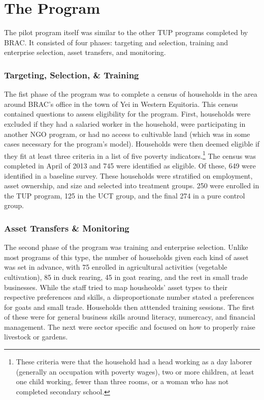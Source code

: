 \documentclass[12pt,article]{article}
\begin{document}
\section*{The Program}
\label{sec-2}

The pilot program itself was similar to the other TUP programs completed by BRAC. It
consisted of four phases: targeting and selection, training and enterprise selection,
asset transfers, and monitoring. 

\subsubsection*{Targeting, Selection, \& Training}
\label{sec-2-0-1}

The fist phase of the program was to complete a census of households in the area
around BRAC's office in the town of Yei in Western Equitoria. This census contained
questions to assess eligibility for the program. First, households were excluded if
they had a salaried worker in the household, were participating in another NGO
program, or had no access to cultivable land (which was in some cases necessary for
the program's model). Households were then deemed eligible if they fit at least three
criteria in a list of five poverty indicators.\footnote{These criteria were that the
household had a head working as a day laborer (generally an occupation with poverty
wages), two or more children, at least one child working, fewer than three rooms, or
a woman who has not completed secondary school.} The census was completed in April of
2013 and 745 were identified as eligible. Of these, 649 were identified in a baseline
survey. These households were stratified on employment, asset ownership, and size and
selected into treatment groups. 250 were enrolled in the TUP program, 125 in the UCT
group, and the final 274 in a pure control group.

\subsubsection*{Asset Transfers \& Monitoring}
\label{sec-2-0-2}

The second phase of the program was training and enterprise selection. Unlike most
programs of this type, the number of households given each kind of asset was set in
advance, with 75 enrolled in agricultural activities (vegetable cultivation), 85 in
duck rearing, 45 in goat rearing, and the rest in small trade businesses. While the
staff tried to map housheolds' asset types to their respective preferences and
skills, a disproportionate number stated a preferences for goats and small trade.
Households then atttended training sessions. The first of these were for general
business skills around literacy, numercacy, and financial management. The next were
sector specific and focused on how to properly raise livestock or gardens. 
\end{document}
